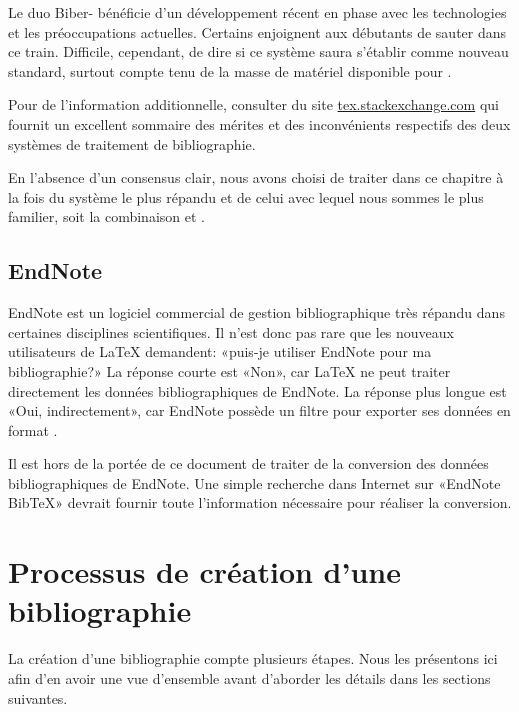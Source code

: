 Le duo Biber- bénéficie d'un développement récent en
phase avec les technologies et les préoccupations actuelles. Certains
enjoignent aux débutants de sauter dans ce train. Difficile,
cependant, de dire si ce système saura s'établir comme nouveau
standard, surtout compte tenu de la masse de matériel disponible pour
{\BibTeX}.

Pour de l'information additionnelle, consulter %
du site \url{tex.stackexchange.com} qui fournit un excellent sommaire des
mérites et des inconvénients respectifs des deux systèmes de
traitement de bibliographie.

En l'absence d'un consensus clair, nous avons choisi de traiter dans
ce chapitre à la fois du système le plus répandu et de celui avec
lequel nous sommes le plus familier, soit la combinaison {\BibTeX} et
.

\subsection{EndNote}
\label{sec:bibliographie:systeme:endnote}

EndNote est un logiciel commercial de gestion bibliographique très
répandu dans certaines disciplines scientifiques. Il n'est donc pas
rare que les nouveaux utilisateurs de {\LaTeX} demandent: «puis-je
utiliser EndNote pour ma bibliographie?» La réponse courte est «Non»,
car {\LaTeX} ne peut traiter directement les données bibliographiques
de EndNote. La réponse plus longue est «Oui, indirectement»,
car EndNote possède un filtre pour exporter ses données en format
{\BibTeX}.

Il est hors de la portée de ce document de traiter de la conversion
des données bibliographiques de EndNote. Une simple recherche dans
Internet sur «EndNote BibTeX» devrait fournir toute l'information
nécessaire pour réaliser la conversion.


\section{Processus de création d'une bibliographie}
\label{sec:bibliographie:processus}

La création d'une bibliographie compte plusieurs étapes. Nous les
présentons ici afin d'en avoir une vue d'ensemble avant d'aborder les
détails dans les sections suivantes.

